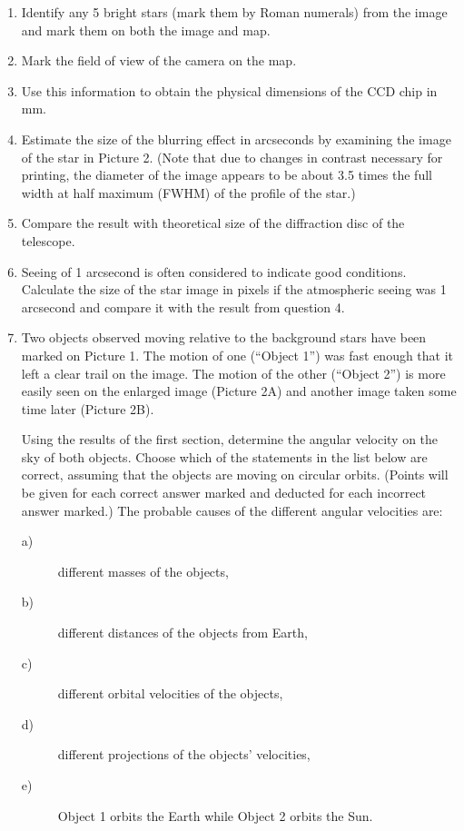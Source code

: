 \begin{enumerate}
\item Identify any 5 bright stars (mark them by Roman numerals) from the
  image and mark them on both the image and map.
\item Mark the field of view of the camera on the map.
\item Use this information to obtain the physical dimensions of the CCD chip
  in mm.
\item Estimate the size of the blurring effect in arcseconds by examining
  the image of the star in Picture 2. (Note that due to changes in contrast
  necessary for printing, the diameter of the image appears to be about 3.5
  times the full width at half maximum (FWHM) of the profile of the star.)
\item Compare the result with theoretical size of the diffraction disc of
  the telescope.
\item Seeing of 1 arcsecond is often considered to indicate good conditions.
  Calculate the size of the star image in pixels if the atmospheric seeing
  was 1 arcsecond and compare it with the result from question 4.
\item Two objects observed moving relative to the background stars have been
  marked on Picture 1. The motion of one (``Object 1'') was fast enough that
  it left a clear trail on the image. The motion of the other (``Object 2'')
  is more easily seen on the enlarged image (Picture 2A) and another image
  taken some time later (Picture 2B).

  Using the results of the first section, determine the angular velocity on
  the sky of both objects. Choose which of the statements in the list below
  are correct, assuming that the objects are moving on circular orbits.
  (Points will be given for each correct answer marked and deducted for each
  incorrect answer marked.) The probable causes of the different angular
  velocities are:
  \begin{description}
  \item[a)] different masses of the objects,
  \item[b)] different distances of the objects from Earth,
  \item[c)] different orbital velocities of the objects,
  \item[d)] different projections of the objects' velocities,
  \item[e)] Object 1 orbits the Earth while Object 2 orbits the Sun.
  \end{description}
\end{enumerate}

